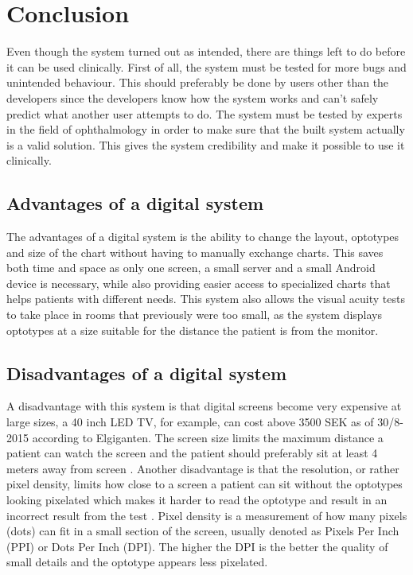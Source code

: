 \documentclass[12pt,a4paper,notitlepage]{report}
\begin{document}
\chapter{ Conclusion}

Even though the system turned out as intended, there are things left to do before it can be used clinically. First of all, the system must be tested for more bugs and unintended behaviour. This should preferably be done by users other than the developers since the developers know how the system works and can't safely predict what another user attempts to do. The system must be tested by experts in the field of ophthalmology in order to make sure that the built system actually is a valid solution. This gives the system credibility and make it possible to use it clinically.

\section{Advantages of a digital system}
The advantages of a digital system is the ability to change the layout, optotypes and size of the chart without having to manually exchange charts. This saves both time and space as only one screen, a small server and a small Android device is necessary, while also providing easier access to specialized charts that helps patients with different needs. This system also allows the visual acuity tests to take place in rooms that previously were too small, as the system displays optotypes at a size suitable for the distance the patient is from the monitor.

\section{Disadvantages of a digital system}
A disadvantage with this system is that digital screens become very expensive at large sizes, a 40 inch LED TV, for example, can cost above 3500 SEK as of 30/8-2015 according to Elgiganten. The screen size limits the maximum distance a patient can watch the screen and the patient should preferably sit at least 4 meters away from screen \cite{PGSoderbergOral}. Another disadvantage is that the resolution, or rather pixel density, limits how close to a screen a patient can sit without the optotypes looking pixelated which makes it harder to read the optotype and result in an incorrect result from the test \cite{PGSoderbergOral}. Pixel density is a measurement of how many pixels (dots) can fit in a small section of the screen, usually denoted as Pixels Per Inch (PPI) or Dots Per Inch (DPI). The higher the DPI is the better the quality of small details and the optotype appears less pixelated.
\end{document}

